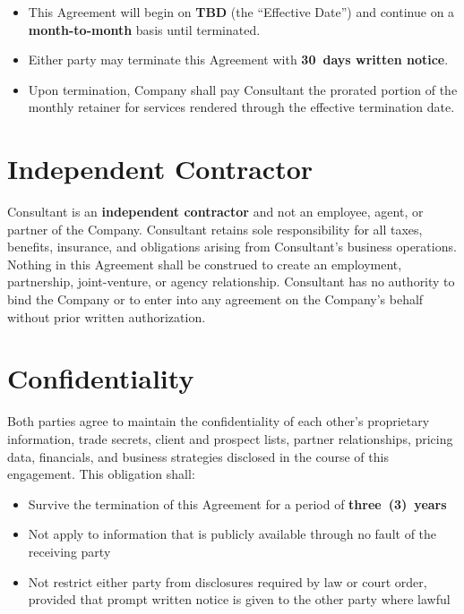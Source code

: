 \documentclass{toospoint}
\begin{document}
\begin{itemize}[leftmargin=1.5em, itemsep=4pt, topsep=4pt]
  \item This Agreement will begin on \textbf{TBD} (the ``Effective Date'') and continue on a \textbf{month-to-month} basis until terminated.
  \item Either party may terminate this Agreement with \textbf{30~days written notice}.
  \item Upon termination, Company shall pay Consultant the prorated portion of the monthly retainer for services rendered through the effective termination date.
\end{itemize}

\section{Independent Contractor}

Consultant is an \textbf{independent contractor} and not an employee, agent, or
partner of the Company. Consultant retains sole responsibility for all taxes,
benefits, insurance, and obligations arising from Consultant's business
operations. Nothing in this Agreement shall be construed to create an
employment, partnership, joint-venture, or agency relationship. Consultant has
no authority to bind the Company or to enter into any agreement on the
Company's behalf without prior written authorization.

\section{Confidentiality}

Both parties agree to maintain the confidentiality of each other's proprietary
information, trade secrets, client and prospect lists, partner relationships,
pricing data, financials, and business strategies disclosed in the course of
this engagement. This obligation shall:

\begin{itemize}[leftmargin=1.5em, itemsep=4pt, topsep=4pt]
  \item Survive the termination of this Agreement for a period of \textbf{three~(3)~years}
  \item Not apply to information that is publicly available through no fault of the receiving party
  \item Not restrict either party from disclosures required by law or court order, provided that prompt written notice is given to the other party where lawful
\end{itemize}
\end{document}
